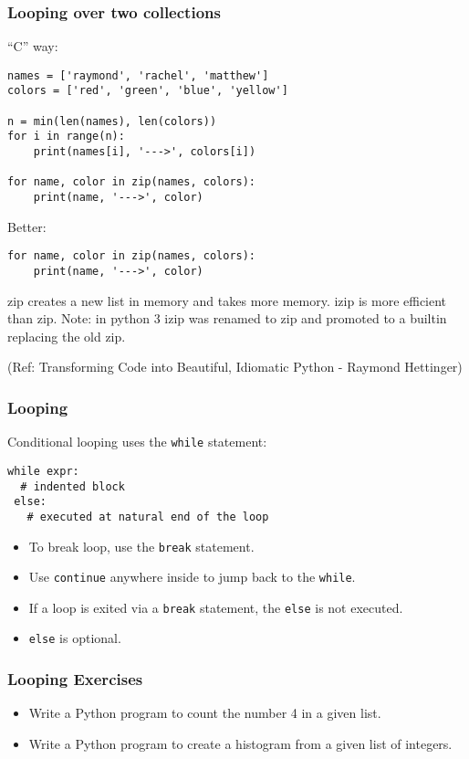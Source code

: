 \begin{frame}[fragile]\frametitle{Looping over two collections}
``C'' way:
\begin{lstlisting}
names = ['raymond', 'rachel', 'matthew']
colors = ['red', 'green', 'blue', 'yellow']

n = min(len(names), len(colors))
for i in range(n):
    print(names[i], '--->', colors[i])

for name, color in zip(names, colors):
    print(name, '--->', color)
\end{lstlisting}
Better:
\begin{lstlisting}
for name, color in zip(names, colors):
    print(name, '--->', color)
\end{lstlisting}

zip creates a new list in memory and takes more memory. izip is more efficient than zip. Note: in python 3 izip was renamed to zip and promoted to a builtin replacing the old zip.


\tiny{(Ref: Transforming Code into Beautiful, Idiomatic Python -  Raymond Hettinger)}
\end{frame}


\begin{frame}[fragile]\frametitle{Looping}
  Conditional looping uses the \lstinline{while} statement:
\begin{lstlisting}
while expr:
  # indented block
 else:
   # executed at natural end of the loop
\end{lstlisting}

\begin{itemize}
\item To break loop, use the \lstinline{break} statement.
\item Use \lstinline{continue} anywhere inside to jump back to the \lstinline{while}.
\item If a loop is exited via a \lstinline{break} statement, the \lstinline{else} is not executed.
\item \lstinline{else} is optional.
\end{itemize}

\end{frame}


\begin{frame}[fragile]\frametitle{Looping Exercises}
\begin{itemize}
\item Write a Python program to count the number 4 in a given list. 
\item Write a Python program to create a histogram from a given list of integers.
\end{itemize}
\end{frame}



